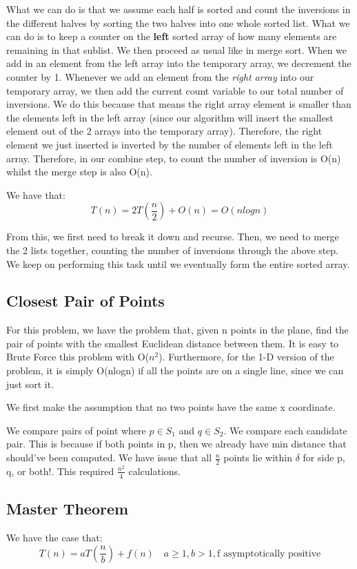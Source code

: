 \documentclass[11pt, oneside]{article}
\theoremstyle{definition}
\begin{document}
What we can do is that we assume each half is sorted and count the inversions in the different halves by sorting the two halves into one whole sorted list. What we can do is to keep a counter on the \textbf{left} sorted array of how many elements are remaining in that sublist. We then proceed as usual like in merge sort. When we add in an element from the left array into the temporary array, we decrement the counter by 1. Whenever we add an element from the \textit{right array} into our temporary array, we then add the current count variable to our total number of inversions. We do this because that means the right array element is smaller than the elements left in the left array (since our algorithm will insert the smallest element out of the 2 arrays into the temporary array). Therefore, the right element we just inserted is inverted by the number of elements left in the left array. Therefore, in our combine step, to count the number of inversion is O(n) whilst the merge step is also O(n).

We have that:
$$
T(n) = 2T(\frac{n}{2}) + O(n) = O(nlogn)
$$

From this, we first need to break it down and recurse. Then, we need to merge the 2 lists together, counting the number of inversions through the above step. We keep on performing this task until we eventually form the entire sorted array.

\subsection{Closest Pair of Points}
For this problem, we have the problem that, given n points in the plane, find the pair of points with the smallest Euclidean distance between them. It is easy to Brute Force this problem with O($n^2$). Furthermore, for the 1-D version of the problem, it is simply O(nlogn) if all the points are on a single line, since we can just sort it.

We first make the assumption that no two points have the same x coordinate.


We compare pairs of point where $p \in S_1$ and $q \in S_2$. We compare each candidate pair. This is because if both points in p, then we already have min distance that should've been computed. We have issue that all $\frac{n}{2}$ points lie within $\delta$ for side p, q, or both!. This required $\frac{n^2}{4}$ calculations.

\subsection{Master Theorem}
We have the case that:
$$
T(n) = aT(\frac{n}{b}) + f(n) \quad a \geq 1, b > 1, \text{f asymptotically positive}
$$
\end{document}
